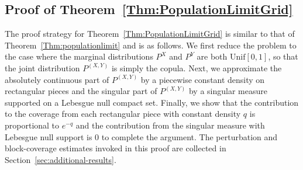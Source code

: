 \documentclass[11pt]{article}
\begin{document}
\subsection{Proof of Theorem~\ref{Thm:PopulationLimitGrid}}
The proof strategy for Theorem~\ref{Thm:PopulationLimitGrid} is similar to that of Theorem~\ref{Thm:populationlimit} and is as follows. We first reduce the problem to the case where the marginal distributions $P^X$ and $P^Y$ are both $\mathrm{Unif}[0,1]$, so that the joint distribution $P^{(X,Y)}$ is simply the copula. Next, we approximate the absolutely continuous part of $P^{(X,Y)}$ by a piecewise constant density on rectangular pieces and the singular part of $P^{(X,Y)}$ by a singular measure supported on a Lebesgue null compact set. Finally, we show that the contribution to the coverage from each rectangular piece with constant density $q$ is proportional to $e^{-q}$ and the contribution from the singular measure with Lebesgue null support is 0 to complete the argument. The perturbation and block-coverage estimates invoked in this proof are collected in Section~\ref{sec:additional-results}.
\end{document}
